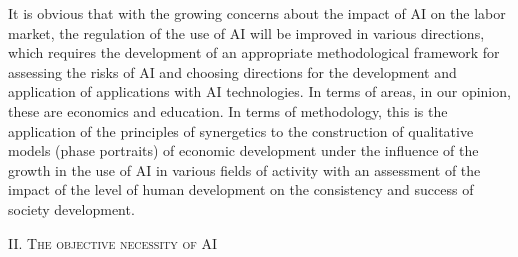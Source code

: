 \documentclass{article}
\begin{document}
\begin{multicols}{2}
It is obvious that with the growing concerns about the
impact of AI on the labor market, the regulation of the
use of AI will be improved in various directions, which
requires the development of an appropriate methodological framework for assessing the risks of AI and choosing directions for the development and application
of applications with AI technologies. In terms of areas, in
our opinion, these are economics and education. In terms
of methodology, this is the application of the principles
of synergetics to the construction of qualitative models
(phase portraits) of economic development under the
influence of the growth in the use of AI in various fields
of activity with an assessment of the impact of the level
of human development on the consistency and success
of society development.
\begin{center}
\vspace{-5pt}
    \large{\textsc{II. The objective necessity of} AI}
    \vspace{-5pt}
\end{center}


\end{multicols}
\end{document}
